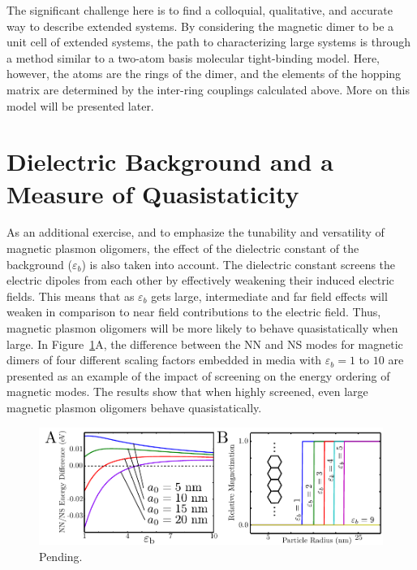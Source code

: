 \documentclass[journal=apchd5,manuscript=article]{achemso}
\begin{document}
The significant challenge here is to find a colloquial, qualitative, and accurate way to describe extended systems. By considering the magnetic dimer to be a unit cell of extended systems, the path to characterizing large systems is through a method similar to a two-atom basis molecular tight-binding model. Here, however, the atoms are the rings of the dimer, and the elements of the hopping matrix are determined by the inter-ring couplings calculated above. More on this model will be presented later.

\section{Dielectric Background and a Measure of Quasistaticity}

As an additional exercise, and to emphasize the tunability and versatility of magnetic plasmon oligomers, the effect of the dielectric constant of the background ($\varepsilon_{b}$) is also taken into account. The dielectric constant screens the electric dipoles from each other by effectively weakening their induced electric fields. This means that as $\varepsilon_{b}$ gets large, intermediate and far field effects will weaken in comparison to near field contributions to the electric field. Thus, magnetic plasmon oligomers will be more likely to behave quasistatically when large. In Figure~\ref{diel_eff}A, the difference between the NN and NS modes for magnetic dimers of four different scaling factors embedded in media with $\varepsilon_{b} = 1$ to $10$ are presented as an example of the impact of screening on the energy ordering of magnetic modes. The results show that when highly screened, even large magnetic plasmon oligomers behave quasistatically.

\begin{figure}
\begin{center}
\includegraphics{diel_magnetization.pdf}
\caption{Pending.}
\label{diel_eff}
\end{center}
\end{figure}
\end{document}
